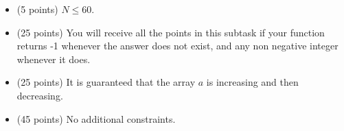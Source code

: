 \documentclass[12pt]{scrartcl}
\begin{document}


    \begin{itemize}
        \item (5 points) $N \le 60$.
        \item (25 points) You will receive all the points in this subtask if your function returns -1 whenever the answer does not exist, and any non negative integer whenever it does.
        \item (25 points) It is guaranteed that the array $a$ is increasing and then decreasing.
        \item (45 points) No additional constraints.
    \end{itemize}
\end{document}
